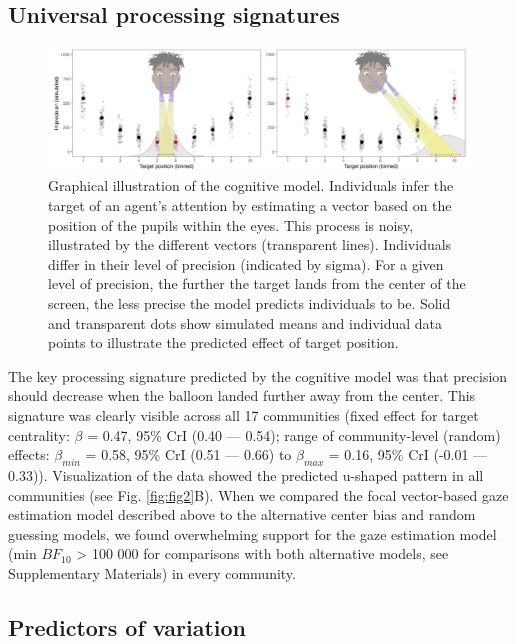 \documentclass[
  man,floatsintext]{apa7}
\begin{document}
\subsection{Universal processing signatures}\label{universal-processing-signatures}

\begin{figure}

{\centering \includegraphics[width=1\linewidth]{../figures/fig1_3} 

}

\caption{Graphical illustration of the cognitive model. Individuals infer the target of an agent’s attention by estimating a vector based on the position of the pupils within the eyes. This process is noisy, illustrated by the different vectors (transparent lines). Individuals differ in their level of precision (indicated by sigma). For a given level of precision, the further the target lands from the center of the screen, the less precise the model predicts individuals to be. Solid and transparent dots show simulated means and individual data points to illustrate the predicted effect of target position.}\label{fig:fig12}
\end{figure}

The key processing signature predicted by the cognitive model was that precision should decrease when the balloon landed further away from the center. This signature was clearly visible across all 17 communities (fixed effect for target centrality: \(\beta\) = 0.47, 95\% CrI (0.40 --- 0.54); range of community-level (random) effects: \(\beta_{min}\) = 0.58, 95\% CrI (0.51 --- 0.66) to \(\beta_{max}\) = 0.16, 95\% CrI (-0.01 --- 0.33)). Visualization of the data showed the predicted u-shaped pattern in all communities (see Fig. \ref{fig:fig2}B). When we compared the focal vector-based gaze estimation model described above to the alternative center bias and random guessing models, we found overwhelming support for the gaze estimation model (min \(BF_{10}\) \textgreater{} 100 000 for comparisons with both alternative models, see Supplementary Materials) in every community.

\subsection{Predictors of variation}\label{predictors-of-variation}
\end{document}
